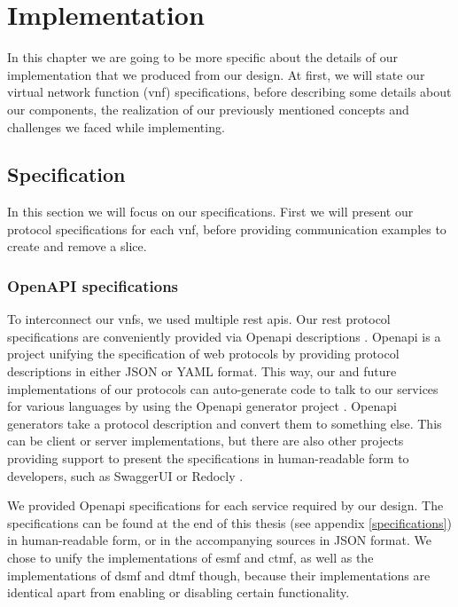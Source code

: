 \chapter{Implementation}
\label{implementation}

In this chapter we are going to be more specific about the details of our implementation that we produced from our design. At first, we will state our virtual network function (\acrshort{vnf}) specifications, before describing some details about our components, the realization of our previously mentioned concepts and challenges we faced while implementing.

\section{Specification}
\label{impl_specification}
In this section we will focus on our specifications. First we will present our protocol specifications for each \acrshort{vnf}, before providing communication examples to create and remove a slice.

\subsection{OpenAPI specifications}
To interconnect our \acrshort{vnf}s, we used multiple \acrshort{rest} \acrshort{api}s. Our \acrshort{rest} protocol specifications are conveniently provided via Open\acrshort{api} descriptions \cite{openapi}. Open\acrshort{api} is a project unifying the specification of web protocols by providing protocol descriptions in either JSON or YAML format. This way, our and future implementations of our protocols can auto-generate code to talk to our services for various languages by using the Open\acrshort{api} generator project \cite{openapi-generator}. Open\acrshort{api} generators take a protocol description and convert them to something else. This can be client or server implementations, but there are also other projects providing support to present the specifications in human-readable form to developers, such as SwaggerUI \cite{swaggerui} or Redocly \cite{redocly}.

We provided Open\acrshort{api} specifications for each service required by our design. The specifications can be found at the end of this thesis (see appendix \ref{specifications}) in human-readable form, or in the accompanying sources in JSON format. We chose to unify the implementations of \acrshort{esmf} and \acrshort{ctmf}, as well as the implementations of \acrshort{dsmf} and \acrshort{dtmf} though, because their implementations are identical apart from enabling or disabling certain functionality.


